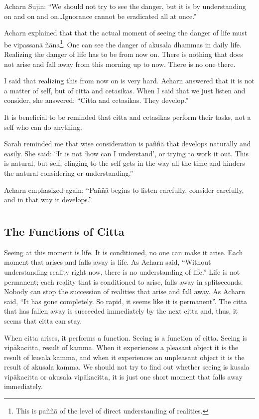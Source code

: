 Acharn Sujin: ``We should not try to see the danger, but it is by
understanding on and on and on\ldots Ignorance cannot be eradicated
all at once.''

Acharn explained that that the actual moment of seeing the danger of
life must be vipassanā ñāna\footnote{This is paññā of the
level of direct understanding of realities.}. One can see the danger
of akusala dhammas in daily life. Realizing the danger of life has to be
from now on. There is nothing that does not arise and fall away from
this morning up to now. There is no one there.

I said that realizing this from now on is very hard. Acharn answered
that it is not a matter of self, but of citta and cetasikas. When I said
that we just listen and consider, she answered: ``Citta and cetasikas.
They develop.''

It is beneficial to be reminded that citta and cetasikas perform their
tasks, not a self who can do anything.

Sarah reminded me that wise consideration is paññā that develops
naturally and easily. She said: ``It is not `how can I understand', or
trying to work it out. This is natural, but self, clinging to the self
gets in the way all the time and hinders the natural considering or
understanding.''

Acharn emphasized again: ``Paññā begins to listen carefully, consider
carefully, and in that way it develops.''

\chapter[The Functions of Citta]{}
\section*{The Functions of Citta}

Seeing at this moment is life. It is conditioned, no one can make it
arise. Each moment that arises and falls away is life. As Acharn said,
``Without understanding reality right now, there is no understanding of
life.'' Life is not permanent; each reality that is conditioned to
arise, falls away in splitseconds. Nobody can stop the succession of
realities that arise and fall away. As Acharn said, ``It has gone
completely. So rapid, it seems like it is permanent''. The citta that
has fallen away is succeeded immediately by the next citta and, thus, it
seems that citta can stay.

When citta arises, it performs a function. Seeing is a function of
citta. Seeing is vipākacitta, result of kamma. When it experiences a
pleasant object it is the result of kusala kamma, and when it
experiences an unpleasant object it is the result of akusala kamma. We
should not try to find out whether seeing is kusala vipākacitta or
akusala vipākacitta, it is just one short moment that falls away
immediately.

